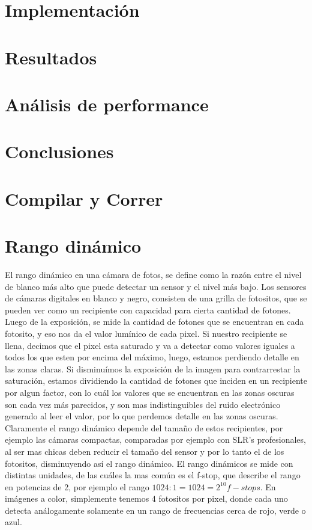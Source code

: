 \documentclass[a4paper,10pt]{article}
\begin{document}
    \section{Implementación}
    

    \section{Resultados}

    \section{Análisis de performance}

    \section{Conclusiones}
    
    \section{Compilar y Correr}

    \appendix

    \section{Rango dinámico}

        El rango dinámico en una cámara de fotos, se define como la razón entre el nivel de blanco más alto que puede detectar un sensor y el nivel más bajo. Los sensores de cámaras digitales en blanco y negro, consisten de una grilla de fotositos, que se pueden ver como un recipiente con capacidad para cierta cantidad de fotones. Luego de la exposición, se mide la cantidad de fotones que se encuentran en cada fotosito, y eso nos da el valor lumínico de cada pixel. Si nuestro recipiente se llena, decimos que el pixel esta saturado y va a detectar como valores iguales a todos los que esten por encima del máximo, luego, estamos perdiendo detalle en las zonas claras. Si disminuímos la exposición de la imagen para contrarrestar la saturación, estamos dividiendo la cantidad de fotones que inciden en un recipiente por algun factor, con lo cuál los valores que se encuentran en las zonas oscuras son cada vez más parecidos, y son mas indistinguibles del ruido electrónico generado al leer el valor, por lo que perdemos detalle en las zonas oscuras. Claramente el rango dinámico depende del tamaño de estos recipientes, por ejemplo las cámaras compactas, comparadas por ejemplo con SLR's profesionales, al ser mas chicas deben reducir el tamaño del sensor y por lo tanto el de los fotositos, disminuyendo así el rango dinámico. El rango dinámicos se mide con distintas unidades, de las cuáles la mas común es el f-stop, que describe el rango en potencias de 2, por ejemplo el rango $1024:1 = 1024 = 2^{10} f-stops$.
        En imágenes a color, simplemente tenemos 4 fotositos por pixel, donde cada uno detecta análogamente solamente en un rango de frecuencias cerca de rojo, verde o azul. 

    
    
\end{document}
